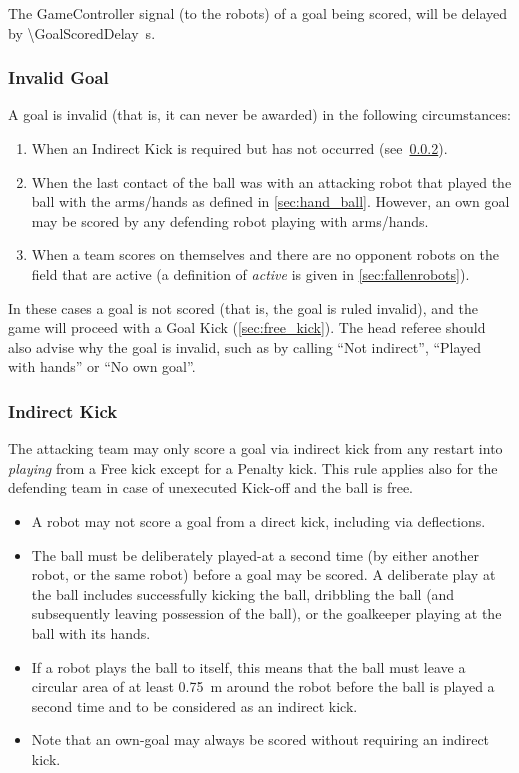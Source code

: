 The GameController signal (to the robots) of a goal being scored, will be delayed by \qty{\GoalScoredDelay}{\second}.

\subsubsection{Invalid Goal}
\label{sec:invalid_goal}

A goal is invalid (that is, it can never be awarded) in the following circumstances:
\begin{enumerate}
    \item When an Indirect Kick is required but has not occurred (see~\cref{sec:indirect_kick}).
    \item When the last contact of the ball was with an attacking robot that played the ball with the arms/hands as defined in \cref{sec:hand_ball}. However, an own goal may be scored by any defending robot playing with arms/hands.
    \item When a team scores on themselves and there are no opponent robots on the field that are active (a definition of \emph{active} is given in \cref{sec:fallenrobots}).
\end{enumerate}

In these cases a goal is not scored (that is, the goal is ruled invalid), and the game will proceed with a Goal Kick (\cf \cref{sec:free_kick}). The head referee should also advise why the goal is invalid, such as by calling ``Not indirect'', ``Played with hands'' or ``No own goal''.

\subsubsection{Indirect Kick}
\label{sec:indirect_kick}

The attacking team may only score a goal via indirect kick from any restart into \textit{playing} from a Free kick except for a Penalty kick. This rule applies also for the defending team in case of unexecuted Kick-off and the ball is free.

\begin{itemize}
  \item A robot may not score a goal from a direct kick, including via deflections.
  \item The ball must be deliberately played-at a second time (by either another robot, or the same robot) before a goal may be scored. A deliberate play at the ball includes successfully kicking the ball, dribbling the ball (and subsequently leaving possession of the ball), or the goalkeeper playing at the ball with its hands.
  \item If a robot plays the ball to itself, this means that the ball must leave a circular area of at least \qty{0.75}{\metre} around the robot before the ball is played a second time and to be considered as an indirect kick.
  \item Note that an own-goal may always be scored without requiring an indirect kick.
\end{itemize}

